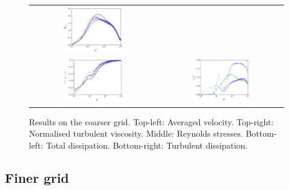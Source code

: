 \documentclass[a4paper]{article}
\begin{document}
\begin{figure}
\begin{tabular}{cc}
\includegraphics[width=0.5\textwidth]{./coarser/rzz.pdf} \\
\includegraphics[width=0.5\textwidth]{./coarser/diss.pdf} &
\includegraphics[width=0.5\textwidth]{./coarser/turb_diss.pdf}
\end{tabular}
\caption{Results on the coarser grid. Top-left: Averaged velocity. Top-right: Normalised turbulent viscosity. Middle: Reynolds stresses. Bottom-left: Total dissipation. Bottom-right: Turbulent dissipation.}
\label{fig-umnurij}
\end{figure}

\subsection{Finer grid}
\end{document}
